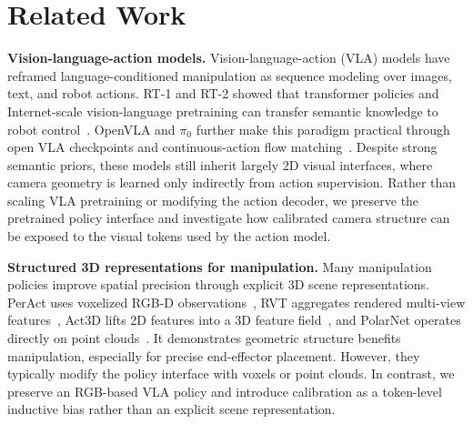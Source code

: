 \documentclass{article}
\begin{document}



 

\section{Related Work}
\textbf{Vision-language-action models.}
Vision-language-action (VLA) models have reframed language-conditioned manipulation as sequence modeling over images, text, and robot actions. RT-1 and RT-2 showed that transformer policies and Internet-scale vision-language pretraining can transfer semantic knowledge to robot control~\citep{brohan2023rt1,zitkovich2023rt2}. OpenVLA and $\pi_0$ further make this paradigm practical through open VLA checkpoints and continuous-action flow matching~\citep{kim2024openvla,black2025pi0}. Despite strong semantic priors, these models still inherit largely 2D visual interfaces, where camera geometry is learned only indirectly from action supervision. Rather than scaling VLA pretraining or modifying the action decoder, we preserve the pretrained policy interface and investigate how calibrated camera structure can be exposed to the visual tokens used by the action model.

\textbf{Structured 3D representations for manipulation.}
Many manipulation policies improve spatial precision through explicit 3D scene representations. PerAct uses voxelized RGB-D observations~\citep{shridhar2023peract}, RVT aggregates rendered multi-view features~\citep{goyal2023rvt}, Act3D lifts 2D features into a 3D feature field~\citep{gervet2023act3d}, and PolarNet operates directly on point clouds~\citep{chen2023polarnet}. It demonstrates geometric structure benefits manipulation, especially for precise end-effector placement. However, they typically modify the policy interface with voxels or point clouds. In contrast, we preserve an RGB-based VLA policy and introduce calibration as a token-level inductive bias rather than an explicit scene representation.
\end{document}
